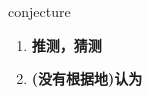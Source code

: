 
\begin{frame}
{\huge conjecture}
\begin{center}
\begin{enumerate}\Large
  \item \textbf{推测，猜测}
  \item \textbf{(没有根据地)认为}
\end{enumerate}
\end{center}
\end{frame}
